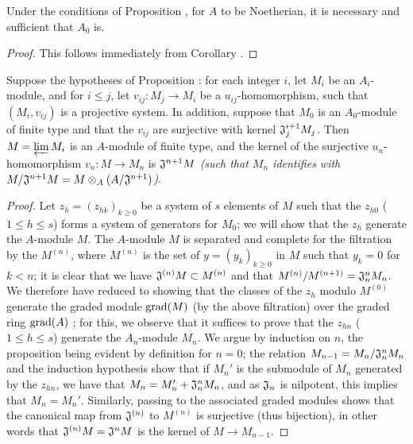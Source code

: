 \begin{cor}[7.2.8]
\label{0.7.2.8}
Under the conditions of Proposition , for $A$ to
be Noetherian, it is necessary and sufficient that $A_0$ is.
\end{cor}

\begin{proof}
\label{proof-0.7.2.8}
This follows immediately from Corollary .
\end{proof}

\begin{prop}[7.2.9]
\label{0.7.2.9}
Suppose the hypotheses of Proposition : for each integer $i$,
let $M_i$ be an $A_i$-module, and for $i\leqslant j$, let $v_{ij}:M_j\to M_i$ be a
$u_{ij}$-homomorphism, such that $(M_i,v_{ij})$ is a projective system. In addition, suppose
that $M_0$ is an $A_0$-module of finite type and that the $v_{ij}$ are surjective with kernel
$\mathfrak{J}_j^{i+1}M_j$. Then $M=\varprojlim M_i$ is an $A$-module of finite type, and the
kernel of the surjective $u_n$-homomorphism $v_n:M\to M_n$ is $\mathfrak{J}^{n+1}M$
\emph{(such that $M_n$ identifies with
$M/\mathfrak{J}^{n+1}M=M\otimes_A(A/\mathfrak{J}^{n+1})$)}.
\end{prop}

\begin{proof}
\label{proof-0.7.2.9}
Let $z_h=(z_{hk})_{k\geqslant 0}$ be a system of $s$ elements of $M$ such that the $z_{h0}$
($1\leqslant h\leqslant s$) forms a system of generators for $M_0$; we will show that the
$z_h$ generate the $A$-module $M$. The $A$-module $M$ is separated and complete for the
filtration by the $M^{(n)}$, where $M^{(n)}$ is the set of $y=(y_k)_{k\geqslant 0}$ in $M$
such that $y_k=0$ for $k<n$; it is clear that we have $\mathfrak{J}^{(n)}M\subset M^{(n)}$
and that $M^{(n)}/M^{(n+1)}=\mathfrak{J}_n^n M_n$. We therefore have reduced to showing that
the classes of the $z_h$ modulo $M^{(0)}$ generate the graded module ${\mathop{\mathrm{grad}}\nolimits}(M)$ (by the
above filtration) over the graded ring ${\mathop{\mathrm{grad}}\nolimits}(A)$ \cite[p.~18--06, lemme]{I-1}; for this, we
observe that it suffices to prove that the $z_{hn}$ ($1\leqslant h\leqslant s$) generate the
$A_n$-module $M_n$. We argue by induction on $n$, the proposition being evident by definition
for $n=0$; the relation $M_{n-1}=M_n/\mathfrak{J}_n^n M_n$ and the induction hypothesis show
that if $M_n'$ is the submodule of $M_n$ generated by the $z_{hn}$, we have that
$M_n=M_n'+\mathfrak{J}_n^n M_n$, and as $\mathfrak{J}_n$ is nilpotent, this implies that
$M_n=M_n'$. Similarly, passing to the associated graded modules shows that the canonical map
from $\mathfrak{J}^{(n)}$ to $M^{(n)}$ is surjective (thus bijection), in other words that
$\mathfrak{J}^{(n)}M=\mathfrak{J}^n M$ is the kernel of $M\to M_{n-1}$.
\end{proof}

